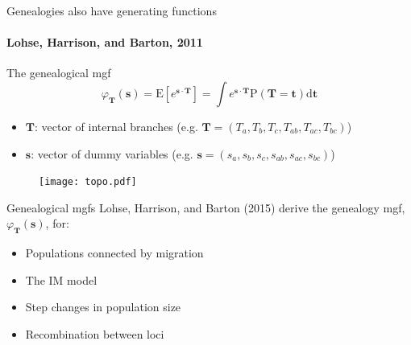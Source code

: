 \documentclass{beamer}
\newcommand{\E}{\mathrm{E}}
\newcommand{\Pro}{\mathrm{P}}
\begin{document}
\begin{frame}{Genealogies also have generating functions}
  \framesubtitle{Lohse, Harrison, and Barton, 2011}
  \begin{block}{The genealogical mgf}
    \begin{equation*}
      \varphi_{\mathbf{T}}(\mathbf{s}) = \E\left[ e^{\mathbf{s} \cdot \mathbf{T}} \right] =
      \int e^{\mathbf{s} \cdot \mathbf{T}} \Pro(\mathbf{T}=\mathbf{t}) \mbox{d}\mathbf{t}
    \end{equation*}
  \end{block}
  \begin{itemize}
  \item $\mathbf{T}$: vector of internal branches (e.g. $\mathbf{T} = (T_a, T_b, T_c, T_{ab}, T_{ac}, T_{bc})$)
  \item $\mathbf{s}$: vector of dummy variables (e.g. $\mathbf{s} = (s_a, s_b, s_c, s_{ab}, s_{ac}, s_{bc})$)
  \end{itemize}
  \begin{figure}
    \texttt{[image: topo.pdf]}        
  \end{figure}
\end{frame}

\begin{frame}{Genealogical mgfs}
  Lohse, Harrison, and Barton (2015) derive the genealogy mgf, $\varphi_{\mathbf{T}}(\mathbf{s})$, for:
  \begin{itemize}
  \item Populations connected by migration
  \item The IM model 
  \item Step changes in population size
  \item Recombination between loci
  \end{itemize}
\end{frame}
\end{document}
